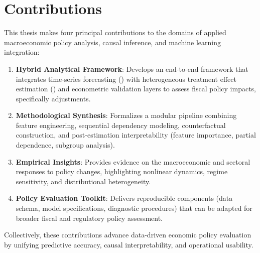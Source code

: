 \section{Contributions}\label{sec:contributions}
This thesis makes four principal contributions to the domains of applied macroeconomic policy analysis, causal inference, and machine learning integration:

\begin{enumerate}[label=\textbf{C\arabic*.}]
  \item \textbf{Hybrid Analytical Framework}: Develops an end-to-end framework that integrates time-series forecasting (\LSTM) with heterogeneous treatment effect estimation (\CF) and econometric validation layers to assess fiscal policy impacts, specifically \VAT{} adjustments.
  \item \textbf{Methodological Synthesis}: Formalizes a modular pipeline combining feature engineering, sequential dependency modeling, counterfactual construction, and post-estimation interpretability (feature importance, partial dependence, subgroup analysis).
  \item \textbf{Empirical Insights}: Provides evidence on the macroeconomic and sectoral responses to \VAT{} policy changes, highlighting nonlinear dynamics, regime sensitivity, and distributional heterogeneity.
  \item \textbf{Policy Evaluation Toolkit}: Delivers reproducible components (data schema, model specifications, diagnostic procedures) that can be adapted for broader fiscal and regulatory policy assessment.
\end{enumerate}

Collectively, these contributions advance data-driven economic policy evaluation by unifying predictive accuracy, causal interpretability, and operational usability.
